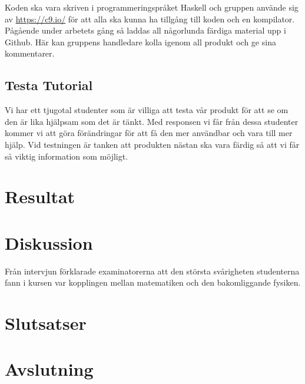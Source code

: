 \documentclass[]{article}
\begin{document}
Koden ska vara skriven i programmeringspråket Haskell och gruppen använde sig av \url{https://c9.io/}
för att alla ska kunna ha tillgång till koden och en kompilator.
Pågående under arbetets gång så laddas all någorlunda färdiga material upp i Github.
Här kan gruppens handledare kolla igenom all produkt och ge sina kommentarer.


\subsection{Testa Tutorial}

Vi har ett tjugotal studenter som är villiga att testa vår produkt för
att se om den är lika hjälpsam som det är tänkt. Med responsen vi får
från dessa studenter kommer vi att göra förändringar för att få den mer
användbar och vara till mer hjälp. Vid testningen är tanken att
produkten nästan ska vara färdig så att vi får så viktig information som
möjligt.

\section{Resultat}

%

\section{Diskussion}



Från intervjun förklarade examinatorerna att den största svårigheten studenterna fann i kursen
var kopplingen mellan matematiken och den bakomliggande fysiken. %



\section{Slutsatser}

\section{Avslutning}

%

\newpage

\printbibliography
\end{document}
